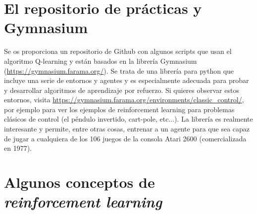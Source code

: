\documentclass{article}
\begin{document}
\section{El repositorio de prácticas y Gymnasium}
Se os proporciona un repositorio de Github con algunos scripts que usan el algoritmo Q-learning y están basados en la librería Gymnasium (\url{https://gymnasium.farama.org/}). Se trata de una librería para python que incluye una serie de entornos y agentes y es especialmente adecuada para probar y desarrollar algoritmos de aprendizaje por refuerzo. Si quieres observar estos entornos, visita \url{https://gymnasium.farama.org/environments/classic_control/}, por ejemplo para ver los ejemplos de reinforcement learning para problemas clásicos de control (el péndulo invertido, cart-pole, etc...). La librería es realmente interesante y permite, entre otras cosas, entrenar a un agente para que sea capaz de jugar a cualquiera de los 106 juegos de la consola Atari 2600 (comercializada en 1977).


\section{Algunos conceptos de \textit{reinforcement learning}}
\end{document}
